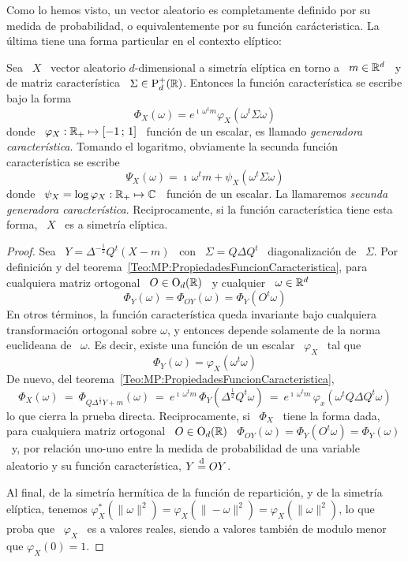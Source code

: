 Como lo hemos visto, un vector aleatorio es completamente definido por su medida
de  probabilidad,  o  equivalentemente  por su  funci\'on  car\'acteristica.  La
\'ultima tiene una forma particular en el contexto el\'iptico:
%
\begin{teorema}
\label{Teo:MP:GeneradorasCaracteristicas}
%
  Sea \ $X$ \ vector  aleatorio $d$-dimensional a simetr\'ia el\'iptica en torno
  a  \  $m   \in  \mathbb{R}^d$  \  y  de  matriz   caracter\'istica  \  $\Sigma  \in
  \mathrm{P}_d^+(\mathbb{R})$. Entonces  la funci\'on  caracter\'istica se escribe  bajo la
  forma
  \[
  \Phi_X(\omega)  = e^{\imath  \,  \omega^t m}  \varphi_X\left( \omega^t  \Sigma
    \omega \right)
  \]
  donde \ $\varphi_X:  \mathbb{R}_+ \mapsto [-1 \, ; \, 1]$ \ funci\'on  de un escalar, es
  llamado {\em  generadora caracter\'istica}.  Tomando  el logaritmo, obviamente
  la secunda funci\'on caracter\'istica se escribe
  \[
  \Psi_X(\omega) =  \imath \, \omega^t  m + \psi_X\left( \omega^t  \Sigma \omega
  \right)
  \]
  donde \  $\psi_X = \log  \varphi_X: \mathbb{R}_+ \mapsto  \mathbb{C}$ \ funci\'on  de un
  escalar.        La        llamaremos       {\em       secunda       generadora
    caracter\'istica}.  Reciprocamente, si  la funci\'on  caracter\'istica tiene
  esta forma, \ $X$ \ es a simetr\'ia el\'iptica.
\end{teorema}
%
\begin{proof}
  Sea \  $Y = \Delta^{-\frac12} Q^t  \left( X - m  \right)$ \ con \  $\Sigma = Q
  \Delta  Q^t$  \ diagonalizaci\'on  de  \  $\Sigma$.   Por definici\'on  y  del
  teorema~\ref{Teo:MP:PropiedadesFuncionCaracteristica},  para  cualquiera matriz
  ortogonal \ $O \in \mathrm{O}_d(\mathbb{R})$ \ y cualquier \ $\omega \in \mathbb{R}^d$
  \[
  \Phi_Y(\omega) = \Phi_{O Y}(\omega) = \Phi_Y(O^t \omega)
  \]
  En  otros  t\'erminos,  la  funci\'on  caracter\'istica  queda  invariante  bajo
  cualquiera  transformaci\'on  ortogonal  sobre  $\omega$,  y  entonces  depende
  solamente  de  la  norma euclideana  de  \  $\omega$.   Es decir,  existe  una
  funci\'on de un escalar \ $\varphi_X$ \ tal que
  \[
  \Phi_Y(\omega) = \varphi_X(\omega^t \omega)
  \]
  De nuevo, del teorema~\ref{Teo:MP:PropiedadesFuncionCaracteristica},
  \[
  \Phi_X(\omega)  \:  = \:  \Phi_{Q  \Delta^{\frac12} Y  +  m}(\omega)  \: =  \:
  e^{\imath  \, \omega^t  m} \,  \Phi_Y( \Delta^{\frac12}  Q^t \omega)  \:  = \:
  e^{\imath \, \omega^t m} \, \varphi_x( \omega^t Q \Delta Q^t \omega)
  \]
  lo que  cierra la prueba  directa.  Reciprocamente, si  \ $\Phi_X$ \  tiene la
  forma dada, para cualquiera matriz ortogonal \ $O \in \mathrm{O}_d(\mathbb{R})$ \ $\Phi_{O
    Y}(\omega)  = \Phi_Y( O^t  \omega )  = \Phi_Y(\omega)$  \ y,  por relaci\'on
  uno-uno  entre  la medida  de  probabilidad de  una  variable  aleatorio y  su
  funci\'on caracter\'istica, $Y \stackrel{\mathrm{d}}{=} O Y$.

  Al final, de la simetr\'ia herm\'itica  de la funci\'on de repartici\'on, y de
  la simetr\'ia el\'iptica, tenemos  $\varphi_X^*\left( \| \omega \|^2 \right) =
  \varphi_X\left(  \| -\omega  \|^2  \right) =  \varphi_X\left(  \| \omega  \|^2
  \right)$,  lo que proba  que \  $\varphi_X$ \  es a  valores reales,  siendo a
  valores tambi\'en de modulo menor que $\varphi_X(0) = 1$.
\end{proof}
